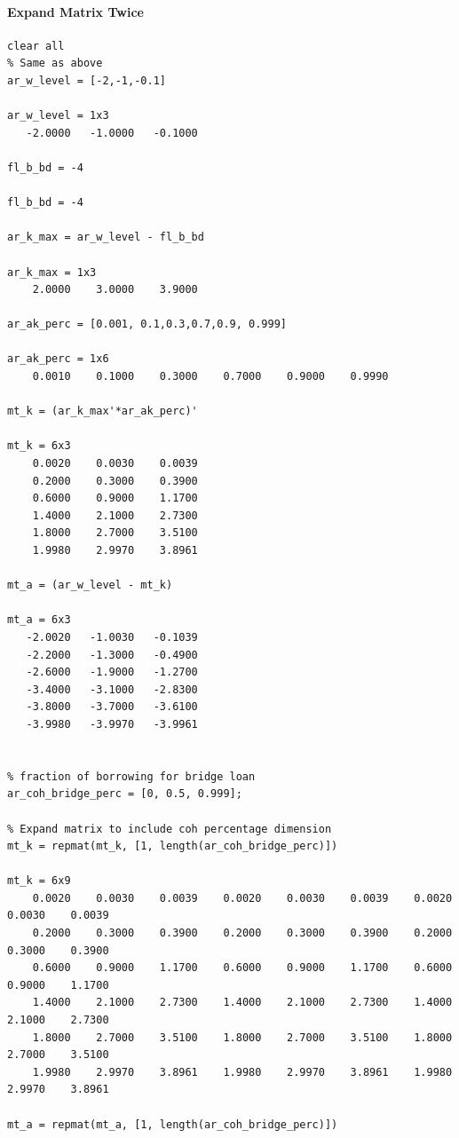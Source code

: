 \documentclass[
]{book}
\begin{document}
\hypertarget{expand-matrix-twice}{%
\paragraph{Expand Matrix Twice}\label{expand-matrix-twice}}

\begin{verbatim}
clear all
% Same as above
ar_w_level = [-2,-1,-0.1]

ar_w_level = 1x3    
   -2.0000   -1.0000   -0.1000

fl_b_bd = -4

fl_b_bd = -4

ar_k_max = ar_w_level - fl_b_bd

ar_k_max = 1x3    
    2.0000    3.0000    3.9000

ar_ak_perc = [0.001, 0.1,0.3,0.7,0.9, 0.999]

ar_ak_perc = 1x6    
    0.0010    0.1000    0.3000    0.7000    0.9000    0.9990

mt_k = (ar_k_max'*ar_ak_perc)'

mt_k = 6x3    
    0.0020    0.0030    0.0039
    0.2000    0.3000    0.3900
    0.6000    0.9000    1.1700
    1.4000    2.1000    2.7300
    1.8000    2.7000    3.5100
    1.9980    2.9970    3.8961

mt_a = (ar_w_level - mt_k)

mt_a = 6x3    
   -2.0020   -1.0030   -0.1039
   -2.2000   -1.3000   -0.4900
   -2.6000   -1.9000   -1.2700
   -3.4000   -3.1000   -2.8300
   -3.8000   -3.7000   -3.6100
   -3.9980   -3.9970   -3.9961


% fraction of borrowing for bridge loan
ar_coh_bridge_perc = [0, 0.5, 0.999];

% Expand matrix to include coh percentage dimension
mt_k = repmat(mt_k, [1, length(ar_coh_bridge_perc)])

mt_k = 6x9    
    0.0020    0.0030    0.0039    0.0020    0.0030    0.0039    0.0020    0.0030    0.0039
    0.2000    0.3000    0.3900    0.2000    0.3000    0.3900    0.2000    0.3000    0.3900
    0.6000    0.9000    1.1700    0.6000    0.9000    1.1700    0.6000    0.9000    1.1700
    1.4000    2.1000    2.7300    1.4000    2.1000    2.7300    1.4000    2.1000    2.7300
    1.8000    2.7000    3.5100    1.8000    2.7000    3.5100    1.8000    2.7000    3.5100
    1.9980    2.9970    3.8961    1.9980    2.9970    3.8961    1.9980    2.9970    3.8961

mt_a = repmat(mt_a, [1, length(ar_coh_bridge_perc)])


\end{verbatim}
\end{document}
